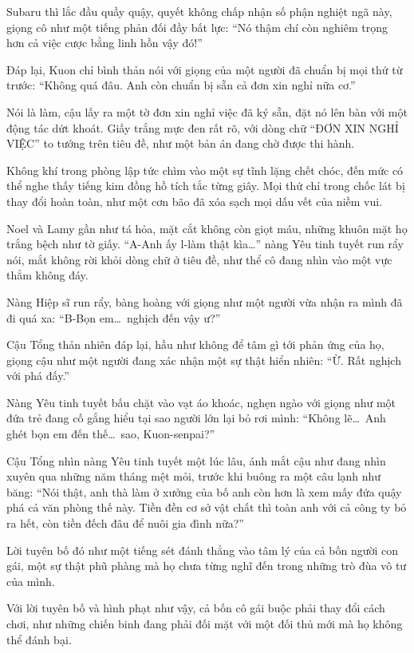 \documentclass[../main.tex]{subfiles}
\begin{document}
Subaru thì lắc đầu quầy quậy, quyết không chấp nhận số phận nghiệt ngã này, giọng cô như một tiếng phản đối đầy bất lực: ``Nó thậm chí còn nghiêm trọng hơn cả việc cược bằng linh hồn vậy đó!''

Đáp lại, Kuon chỉ bình thản nói với giọng của một người đã chuẩn bị mọi thứ từ trước: ``Không quá đâu. Anh còn chuẩn bị sẵn cả đơn xin nghỉ nữa cơ.''

Nói là làm, cậu lấy ra một tờ đơn xin nghỉ việc đã ký sẵn, đặt nó lên bàn với một động tác dứt khoát. Giấy trắng mực đen rất rõ, với dòng chữ ``ĐƠN XIN NGHỈ VIỆC'' to tướng trên tiêu đề, như một bản án đang chờ được thi hành.

Không khí trong phòng lập tức chìm vào một sự tĩnh lặng chết chóc, đến mức có thể nghe thấy tiếng kim đồng hồ tích tắc từng giây. Mọi thứ chỉ trong chốc lát bị thay đổi hoàn toàn, như một cơn bão đã xóa sạch mọi dấu vết của niềm vui.

Noel và Lamy gần như tá hỏa, mặt cắt không còn giọt máu, những khuôn mặt họ trắng bệch như tờ giấy. ``A-Anh ấy l-làm thật kìa\dots'' nàng Yêu tinh tuyết run rẩy nói, mắt không rời khỏi dòng chữ ở tiêu đề, như thể cô đang nhìn vào một vực thẳm không đáy.

Nàng Hiệp sĩ run rẩy, bàng hoàng với giọng như một người vừa nhận ra mình đã đi quá xa: ``B-Bọn em\dots\ nghịch đến vậy ư?''

Cậu Tổng thản nhiên đáp lại, hầu như không để tâm gì tới phản ứng của họ, giọng cậu như một người đang xác nhận một sự thật hiển nhiên: ``Ừ. Rất nghịch với phá đấy.''

Nàng Yêu tinh tuyết bấu chặt vào vạt áo khoác, nghẹn ngào với giọng như một đứa trẻ đang cố gắng hiểu tại sao người lớn lại bỏ rơi mình: ``Không lẽ\dots\ Anh ghét bọn em đến thế\dots\ sao, Kuon-senpai?''

Cậu Tổng nhìn nàng Yêu tinh tuyết một lúc lâu, ánh mắt cậu như đang nhìn xuyên qua những năm tháng mệt mỏi, trước khi buông ra một câu lạnh như băng: ``Nói thật, anh thà làm ở xưởng của bố anh còn hơn là xem mấy đứa quậy phá cả văn phòng thế này. Tiền đền cơ sở vật chất thì toàn anh với cả công ty bỏ ra hết, còn tiền đếch đâu để nuôi gia đình nữa?''

Lời tuyên bố đó như một tiếng sét đánh thẳng vào tâm lý của cả bốn người con gái, một sự thật phũ phàng mà họ chưa từng nghĩ đến trong những trò đùa vô tư của mình.

Với lời tuyên bố và hình phạt như vậy, cả bốn cô gái buộc phải thay đổi cách chơi, như những chiến binh đang phải đối mặt với một đối thủ mới mà họ không thể đánh bại.
\end{document}
